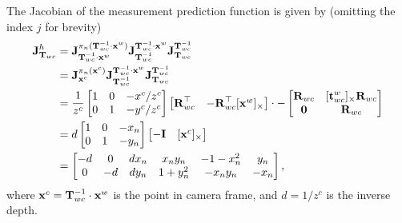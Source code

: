 The Jacobian of the measurement prediction function is given by (omitting the index $j$ for brevity)
\begin{subequations} \label{eq:ba-pose-jacobian}
\begin{align}
  \jac{h}{\matT_{wc}} &= \jac{\pi_n(\matT_{wc}^{-1} \cdot \vecx^w)}{\matT_{wc}^{-1} \cdot \vecx^w} \jac{\matT_{wc}^{-1} \cdot \vecx^w}{\matT_{wc}^{-1}} \jac{\matT_{wc}^{-1}}{\matT_{wc}}\\
  &= \jac{\pi_n(\vecx^c)}{\vecx^c} \jac{\matT_{wc}^{-1} \cdot \vecx^w}{\matT_{wc}^{-1}} \jac{\matT_{wc}^{-1}}{\matT_{wc}}\\
  &= \frac{1}{z^c}
  \begin{bmatrix}
  1 & 0 & -x^c/z^c\\
  0 & 1 & -y^c/z^c
  \end{bmatrix}
  \begin{bmatrix}
    \matR_{wc}\trans & -\matR_{wc}\trans \skewsymm{\vecx^w}
  \end{bmatrix}
  \cdot
  -\begin{bmatrix}
    \matR_{wc} & \skewsymm{\vect^w_{wc}} \matR_{wc}\\
    \matr{0} & \matR_{wc}
  \end{bmatrix}\\
  &= d
  \begin{bmatrix}
  1 & 0 & -x_n\\
  0 & 1 & -y_n
  \end{bmatrix}
  \begin{bmatrix}
  -\matI & \skewsymm{\vecx^c}
  \end{bmatrix}\\
  &=
  \begin{bmatrix}
    -d & 0 & dx_n & x_n y_n & -1-x^2_n & y_n\\
    0 & -d & dy_n & 1 + y^2_n & -x_n y_n & -x_n
  \end{bmatrix},
\end{align}
\end{subequations}
where $\vecx^c = \matT_{wc}^{-1} \cdot \vecx^w$ is the point in camera frame, and $d = 1/z^c$ is the inverse depth.

